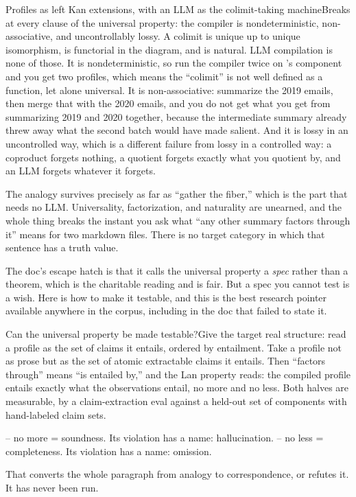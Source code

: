 \begin{Analogy}{Profiles as left Kan extensions, with an LLM as the colimit-taking machine}{Breaks at every clause of the universal property: the compiler is nondeterministic, non-associative, and uncontrollably lossy.}
A colimit is unique up to unique isomorphism, is functorial in the diagram, and is natural. LLM compilation is none of those. It is nondeterministic, so run the compiler twice on \labColleague's component and you get two profiles, which means the ``colimit'' is not well defined as a function, let alone universal. It is non-associative: summarize the 2019 emails, then merge that with the 2020 emails, and you do not get what you get from summarizing 2019 and 2020 together, because the intermediate summary already threw away what the second batch would have made salient. And it is lossy in an uncontrolled way, which is a different failure from lossy in a controlled way: a coproduct forgets nothing, a quotient forgets exactly what you quotient by, and an LLM forgets whatever it forgets.

The analogy survives precisely as far as ``gather the fiber,'' which is the part that needs no LLM. Universality, factorization, and naturality are unearned, and the whole thing breaks the instant you ask what ``any other summary factors through it'' means for two markdown files. There is no target category in which that sentence has a truth value.
\end{Analogy}

The doc's escape hatch is that it calls the universal property a \emph{spec} rather than a theorem, which is the charitable reading and is fair. But a spec you cannot test is a wish. Here is how to make it testable, and this is the best research pointer available anywhere in the corpus, including in the doc that failed to state it.

\begin{Open}{Can the universal property be made testable?}{Give the target real structure: read a profile as the set of claims it entails, ordered by entailment.}
Take a profile not as prose but as the set of atomic extractable claims it entails. Then ``factors through'' means ``is entailed by,'' and the Lan property reads: the compiled profile entails exactly what the observations entail, no more and no less. Both halves are measurable, by a claim-extraction eval against a held-out set of components with hand-labeled claim sets.

\begin{Check}
-- no more  =  soundness.    Its violation has a name: hallucination.
-- no less  =  completeness. Its violation has a name: omission.
\end{Check}

That converts the whole paragraph from analogy to correspondence, or refutes it. It has never been run.
\end{Open}

